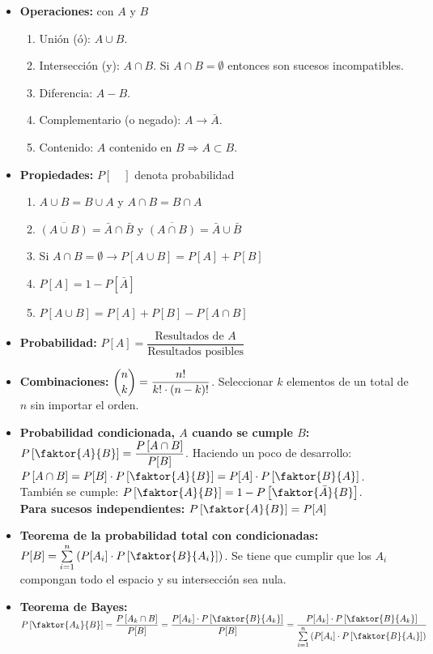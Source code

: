 \documentclass[a4paper, twocolumn, 10pt]{article}
\begin{document}
\begin{itemize}
	\item \textbf{Operaciones:} con $A$ y $B$
	\begin{enumerate}
		\item Unión (ó): $A\cup B.$
		\item Intersección (y): $A\cap B$. Si $A \cap B = \emptyset$ entonces son sucesos incompatibles.
		\item Diferencia: $A-B.$
		\item Complementario (o negado): $A \rightarrow \bar{A}.$
		\item Contenido: $A$ contenido en $B \Rightarrow A\subset B.$
	\end{enumerate}
 	\item \textbf{Propiedades:} $P[\quad]$ denota probabilidad
 	\begin{enumerate}
 		\item $A \cup B = B \cup A$ y $A \cap B = B\cap A$
 		\item $\overline{(A \cup B)} = \bar{A} \cap \bar{B}$ y $\overline{(A \cap B)} = \bar{A} \cup \bar{B}$
 		\item Si $A \cap B = \emptyset \rightarrow P[A \cup B] = P[A] + P[B]$
 		\item $P[A] = 1 - P[\bar{A}]$
 		\item $P[A\cup B] = P[A] + P[B] - P[A \cap B]$
 	\end{enumerate}
 	\item \textbf{Probabilidad:} $P[A] = \dfrac{\text{Resultados de } A}{\text{Resultados posibles}}$
 	\item \textbf{Combinaciones:} $\dbinom{n}{k} = \dfrac{n!}{k!\cdot(n-k)!}$. Seleccionar $k$ elementos de un total de $n$ sin importar el orden.
 	\item \textbf{Probabilidad condicionada, $A$ cuando se cumple $B$:} $P\left[\faktor{A}{B}\right] = \dfrac{P\left[A\cap B\right]}{P[B]}$. Haciendo un poco de desarrollo: $P\left[A\cap B\right] = P[B] \cdot P\left[\faktor{A}{B}\right] = P[A]\cdot P\left[\faktor{B}{A}\right]$. También se cumple: $P\left[\faktor{A}{B}\right] = 1 - P\left[\faktor{\bar{A}}{B}\right]$. \\ \textbf{Para sucesos independientes:} $P\left[\faktor{A}{B}\right] = P[A]$
 	\item \textbf{Teorema de la probabilidad total con condicionadas:} $P[B] = \sum\limits_{i=1}^{n}\left(P[A_i] \cdot P\left[\faktor{B}{A_i}\right]\right)$. Se tiene que cumplir que los $A_i$ compongan todo el espacio y su intersección sea nula. 
 	\item \textbf{Teorema de Bayes:} $P\left[\faktor{A_k}{B}\right] = \dfrac{P\left[A_k\cap B\right]}{P[B]} = \dfrac{P[A_k]\cdot P\left[\faktor{B}{A_k}\right]}{P[B]} = \dfrac{P[A_k]\cdot P\left[\faktor{B}{A_k}\right]}{\sum\limits_{i=1}^{n}\left(P[A_i] \cdot P\left[\faktor{B}{A_i}\right]\right)}$ 
\end{itemize}
\end{document}
